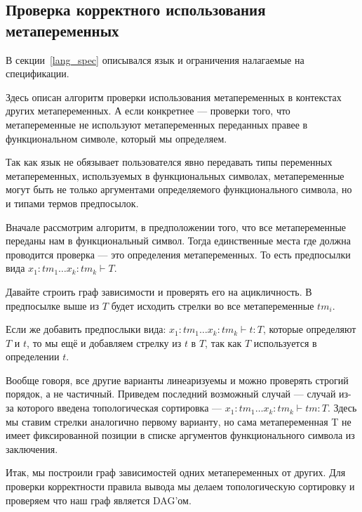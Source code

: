\subsection{Проверка корректного использования метапеременных}\label{toposort}
В секции~\ref{lang_spec} описывался язык и ограничения налагаемые на спецификации.

Здесь описан алгоритм проверки использования метапеременных в контекстах других метапеременных. А если конкретнее --- проверки того, что метапеременные не используют метапеременных переданных правее в функциональном символе, который мы определяем.

Так как язык не обязывает пользователся явно передавать типы переменных метапеременных, используемых в функциональных символах, метапеременные могут быть не только аргументами определяемого функционального символа, но и типами термов предпосылок.

Вначале рассмотрим алгоритм, в предположении того, что все метапеременные переданы нам в функциональный символ. Тогда единственные места где должна проводится проверка --- это определения метапеременных. То есть предпосылки вида $x_1 : tm_1 \ldots x_k : tm_k  \vdash T$.

Давайте строить граф зависимости и проверять его на ацикличность. В предпосылке выше из $T$ будет исходить стрелки во все метапеременные $tm_i$.

Если же добавить предпослыки вида: $x_1 : tm_1 \ldots x_k : tm_k  \vdash t : T$, которые определяют $T$ и $t$, то мы ещё и добавляем стрелку из $t$ в $T$, так как $T$ используется в определении $t$.

Вообще говоря, все другие варианты линеаризуемы и можно проверять строгий порядок, а не частичный. Приведем последний возможный случай --- случай из-за которого введена топологическая сортировка --- $x_1 : tm_1 \ldots x_k : tm_k  \vdash tm : T$. Здесь мы ставим стрелки аналогично первому варианту, но сама метапеременная T не имеет фиксированной позиции в списке аргументов функционального символа из заключения.

Итак, мы построили граф зависимостей одних метапеременных от других. Для проверки корректности правила вывода мы делаем топологическую сортировку и проверяем что наш граф является DAG'ом.

























